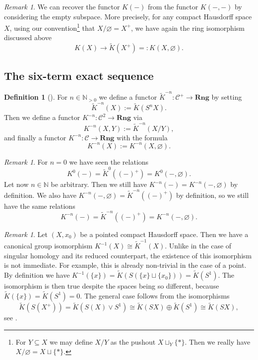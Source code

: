 \documentclass[12pt,a4paper]{amsart}
\theoremstyle{plain}
\theoremstyle{definition}
\newtheorem{defn}[thm]{Definition}
\theoremstyle{remark}
\newtheorem{rem}[thm]{Remark}
\begin{document}
\begin{rem}
  We can recover the functor $K(-)$ from the functor $K(-,-)$ by considering the empty subspace.
  More precisely, for any compact Hausdorff space $X$, using our convention\footnote{For $Y \subseteq X$ we may define $X/Y$ as the pushout $X \sqcup_{Y} \{ * \}$.
  Then we really have $X/\varnothing = X \sqcup \{ * \}$.} that $X/\varnothing = X^{+}$, we have again the ring isomorphism discussed above
  \[ K(X) \to \tilde{K}(X^{+}) =: K(X, \varnothing). \]
\end{rem}

\subsection{The six-term exact sequence}

\begin{defn}[{\cite[Definition 2.4.1]{ati67}}]
  For $n \in \mathbb{N}_{>0}$ we define a functor $\tilde{K}^{-n} \colon \mathcal{C}^{+} \to \mathbf{Rng}$ by setting
  \[ \tilde{K}^{-n}(X) := \tilde{K}(S^{n}X). \]
  Then we define a functor $K^{-n} \colon \mathcal{C}^{2} \to \mathbf{Rng}$ via
  \[ K^{-n}(X,Y) := \tilde{K}^{-n}(X/Y), \]
  and finally a functor $K^{-n} \colon \mathcal{C} \to \mathbf{Rng}$ with the formula
  \[ K^{-n}(X) := K^{-n}(X, \varnothing). \]
\end{defn}

\begin{rem}
  For $n = 0$ we have seen the relations
  \[ K^{0}(-) = \tilde{K}^{0}((-)^{+}) = K^{0}(-, \varnothing). \]
  Let now $n \in \mathbb{N}$ be arbitrary.
  Then we still have $K^{-n}(-) = K^{-n}(-, \varnothing)$ by definition.
  We also have $K^{-n}(-, \varnothing) = \tilde{K}^{-n}((-)^{+})$ by definition, so we still have the same relations
  \[ K^{-n}(-) = \tilde{K}^{-n}((-)^{+}) = K^{-n}(-, \varnothing). \]
\end{rem}

\begin{rem}
  Let $(X,x_{0})$ be a pointed compact Hausdorff space.
  Then we have a canonical group isomorphism $K^{-1}(X) \cong \tilde{K}^{-1}(X)$.
  Unlike in the case of singular homology and its reduced counterpart, the existence of this isomorphism is not immediate.
  For example, this is already non-trivial in the case of a point.
  By definition we have $K^{-1}(\{ x \}) = \tilde{K}(S(\{ x \} \sqcup \{ x_{0} \})) = \tilde{K}(S^{1})$.
  The isomorphism is then true despite the spaces being so different, because $\tilde{K}(\{ x \}) = \tilde{K}(S^{1}) = 0$.
  The general case follows from the isomorphisms
  \[ \tilde{K}(S(X^{+})) = \tilde{K}(S(X) \vee S^{1}) \cong \tilde{K}(SX) \oplus \tilde{K}(S^{1}) \cong \tilde{K}(SX), \]
  see \cite[p.~57]{hat03}.
\end{rem}
\end{document}
